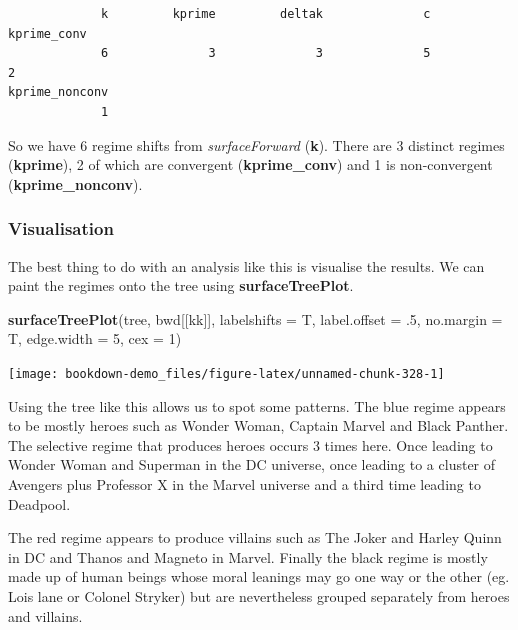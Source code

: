\documentclass[
]{book}
\newenvironment{Shaded}{\begin{snugshade}}{\end{snugshade}}
\newcommand{\DataTypeTok}[1]{\textcolor[rgb]{0.13,0.29,0.53}{#1}}
\newcommand{\DecValTok}[1]{\textcolor[rgb]{0.00,0.00,0.81}{#1}}
\newcommand{\FloatTok}[1]{\textcolor[rgb]{0.00,0.00,0.81}{#1}}
\newcommand{\KeywordTok}[1]{\textcolor[rgb]{0.13,0.29,0.53}{\textbf{#1}}}
\newcommand{\NormalTok}[1]{#1}
\begin{document}
\begin{verbatim}
             k         kprime         deltak              c    kprime_conv 
             6              3              3              5              2 
kprime_nonconv 
             1 
\end{verbatim}

So we have 6 regime shifts from \emph{surfaceForward} (\textbf{k}). There are 3 distinct regimes (\textbf{kprime}), 2 of which are convergent (\textbf{kprime\_conv}) and 1 is non-convergent (\textbf{kprime\_nonconv}).

\hypertarget{visualisation}{%
\subsubsection{Visualisation}\label{visualisation}}

The best thing to do with an analysis like this is visualise the results. We can paint the regimes onto the tree using \textbf{surfaceTreePlot}.

\begin{Shaded}
\begin{Highlighting}[]
\KeywordTok{surfaceTreePlot}\NormalTok{(tree, bwd[[kk]], }\DataTypeTok{labelshifts =}\NormalTok{ T, }\DataTypeTok{label.offset =} \FloatTok{.5}\NormalTok{, }
                \DataTypeTok{no.margin =}\NormalTok{ T, }\DataTypeTok{edge.width =} \DecValTok{5}\NormalTok{, }\DataTypeTok{cex =} \DecValTok{1}\NormalTok{)}
\end{Highlighting}
\end{Shaded}

\begin{center}\texttt{[image: bookdown-demo\_files/figure-latex/unnamed-chunk-328-1]} \end{center}

Using the tree like this allows us to spot some patterns. The blue regime appears to be mostly heroes such as Wonder Woman, Captain Marvel and Black Panther. The selective regime that produces heroes occurs 3 times here. Once leading to Wonder Woman and Superman in the DC universe, once leading to a cluster of Avengers plus Professor X in the Marvel universe and a third time leading to Deadpool.

The red regime appears to produce villains such as The Joker and Harley Quinn in DC and Thanos and Magneto in Marvel. Finally the black regime is mostly made up of human beings whose moral leanings may go one way or the other (eg. Lois lane or Colonel Stryker) but are nevertheless grouped separately from heroes and villains.
\end{document}

